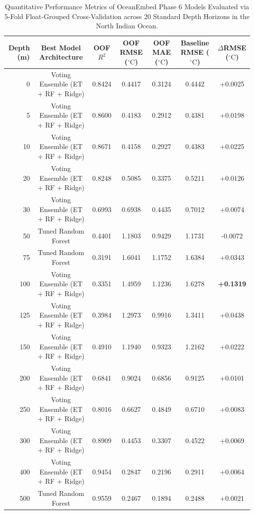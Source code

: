 \documentclass[conference]{IEEEtran}
\begin{document}
\begin{table}[t]
\centering
\caption{Quantitative Performance Metrics of OceanEmbed Phase 6 Models Evaluated via 5-Fold Float-Grouped Cross-Validation across 20 Standard Depth Horizons in the North Indian Ocean.}
\label{tab:depth_metrics}
\small
\begin{tabular}{@{}rcccccc@{}}
\toprule
\textbf{Depth (m)} & \textbf{Best Model Architecture} & \textbf{OOF $R^2$} & \textbf{OOF RMSE ($^\circ\text{C}$)} & \textbf{OOF MAE ($^\circ\text{C}$)} & \textbf{Baseline RMSE ($^\circ\text{C}$)} & \textbf{$\Delta$RMSE ($^\circ\text{C}$)} \\
\midrule
0    & Voting Ensemble (ET + RF + Ridge) & 0.8424 & 0.4417 & 0.3124 & 0.4442 & +0.0025 \\
5    & Voting Ensemble (ET + RF + Ridge) & 0.8600 & 0.4183 & 0.2912 & 0.4381 & +0.0198 \\
10   & Voting Ensemble (ET + RF + Ridge) & 0.8671 & 0.4158 & 0.2927 & 0.4383 & +0.0225 \\
20   & Voting Ensemble (ET + RF + Ridge) & 0.8248 & 0.5085 & 0.3375 & 0.5211 & +0.0126 \\
30   & Voting Ensemble (ET + RF + Ridge) & 0.6993 & 0.6938 & 0.4435 & 0.7012 & +0.0074 \\
\midrule
50   & Tuned Random Forest               & 0.4401 & 1.1803 & 0.9429 & 1.1731 & -0.0072 \\
75   & Tuned Random Forest               & 0.3191 & 1.6041 & 1.1752 & 1.6384 & +0.0343 \\
100  & Voting Ensemble (ET + RF + Ridge) & 0.3351 & 1.4959 & 1.1236 & 1.6278 & \textbf{+0.1319} \\
125  & Voting Ensemble (ET + RF + Ridge) & 0.3984 & 1.2973 & 0.9916 & 1.3411 & +0.0438 \\
150  & Voting Ensemble (ET + RF + Ridge) & 0.4910 & 1.1940 & 0.9323 & 1.2162 & +0.0222 \\
\midrule
200  & Voting Ensemble (ET + RF + Ridge) & 0.6841 & 0.9024 & 0.6856 & 0.9125 & +0.0101 \\
250  & Voting Ensemble (ET + RF + Ridge) & 0.8016 & 0.6627 & 0.4849 & 0.6710 & +0.0083 \\
300  & Voting Ensemble (ET + RF + Ridge) & 0.8909 & 0.4453 & 0.3307 & 0.4522 & +0.0069 \\
400  & Voting Ensemble (ET + RF + Ridge) & 0.9454 & 0.2847 & 0.2196 & 0.2911 & +0.0064 \\
500  & Tuned Random Forest               & 0.9559 & 0.2467 & 0.1894 & 0.2488 & +0.0021 \\

\end{tabular}
\end{table}
\end{document}

